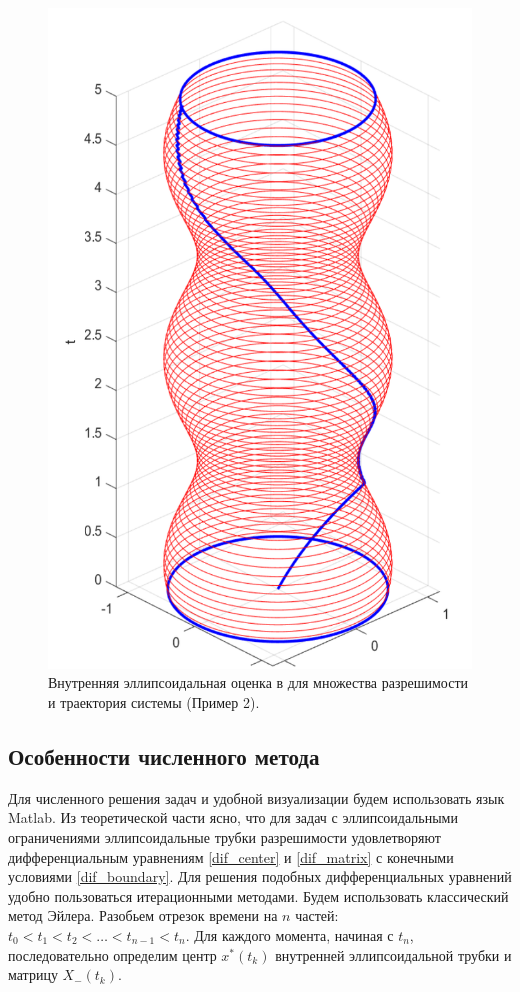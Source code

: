 \begin{figure}[ht]
	\centering
	\includegraphics[width = 0.5\linewidth]{"./resources/evolution_with_touch_3_cropped.pdf"}
	\caption{Внутренняя эллипсоидальная оценка в для множества разрешимости и траектория системы (Пример 2).}
    \label{fig:inner_tube_2}
\end{figure}

\subsection{Особенности численного метода}

Для численного решения задач и удобной визуализации будем использовать язык
 Matlab. Из теоретической части ясно, что для задач с эллипсоидальными ограничениями
 эллипсоидальные трубки разрешимости удовлетворяют дифференциальным уравнениям \eqref{dif_center}
 и  \eqref{dif_matrix} с конечными условиями \eqref{dif_boundary}.
Для решения подобных дифференциальных уравнений удобно пользоваться итерационными 
 методами. Будем использовать классический метод Эйлера.
Разобьем отрезок времени на \( n \) частей: \( t_0 < t_1 < t_2 < \dots < t_{n-1} < t_n \). 
 Для каждого момента, начиная с \( t_n \), последовательно определим центр \( x^*(t_k) \) внутренней
 эллипсоидальной трубки и матрицу \( X_-(t_k) \). 

